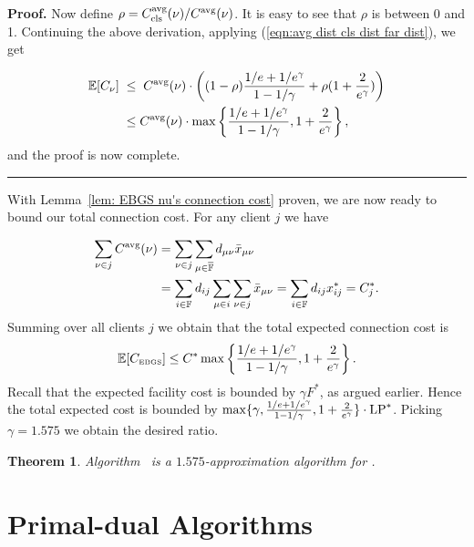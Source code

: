 \documentclass[oneside,final]{ucr}
\newtheorem{theorem}{Theorem}
\newenvironment{proof}[1][Proof]{\textbf{#1.} }{\ \rule{0.5em}{0.5em}}
\def\dsp{\def\baselinestretch{2.0}\large\normalsize}
\def\ssp{\def\baselinestretch{1.0}\large\normalsize}
\begin{document}
\begin{proof}
Now define $\rho =C_{{\mbox{\scriptsize\rm cls}}}^{{\mbox{\scriptsize\rm avg}}}(\nu)/C^{{\mbox{\scriptsize\rm avg}}}(\nu)$. It is easy
to see that $\rho$ is between 0 and 1. Continuing the above
derivation, applying (\ref{eqn:avg dist cls dist far dist}),
we get

\ssp
\begin{align*}
\mathbb{E}[C_{\nu}]
             \;&\le\; C^{{\mbox{\scriptsize\rm avg}}}(\nu) 
			\cdot\left((1-\rho)\frac{1/e+1/e^\gamma}{1-1/\gamma} 
				+ \rho (1 + \frac{2}{e^\gamma})\right)
			\\
             &\leq C^{{\mbox{\scriptsize\rm avg}}}(\nu) 
				\cdot \max\left\{\frac{1/e+1/e^\gamma}{1-1/\gamma}, 1 + \frac{2}{e^\gamma}\right\},
\end{align*}
\dsp
and the proof is now complete.
\end{proof}

With Lemma~\ref{lem: EBGS nu's connection cost} proven, we are now ready to bound our total connection cost.
For any client $j$ we have

\ssp
\begin{align*}
\sum_{\nu\in j} C^{{\mbox{\scriptsize\rm avg}}}(\nu)
	&= \sum_{\nu\in j}\sum_{\mu\in\overline{\mathbb{F}}} d_{\mu\nu}{\bar x}_{\mu\nu} 
	\\
	&= \sum_{i\in\mathbb{F}}d_{ij}\sum_{\mu\in i}\sum_{\nu\in j} {\bar x}_{\mu\nu}
	= \sum_{i\in\mathbb{F}} d_{ij}x_{ij}^\ast = C_j^\ast.
\end{align*}
\dsp
Summing over all clients $j$ we obtain that the total expected connection cost is
%
\begin{equation*}
	\mathbb{E}[ C_{\mbox{\tiny\rm EBGS}} ] \le  C^\ast\max\left\{\frac{1/e+1/e^\gamma}{1-1/\gamma}, 1+\frac{2}{e^\gamma}\right\}.
\end{equation*}
%
Recall that the expected facility cost is bounded by $\gamma F^\ast$,
as argued earlier. Hence the total expected cost is bounded by $\max\{\gamma,
\frac{1/e+1/e^\gamma}{1-1/\gamma}, 1+\frac{2}{e^\gamma}\}\cdot
\mbox{\rm LP}^\ast$. Picking $\gamma=1.575$ we obtain the desired ratio.


\begin{theorem}\label{thm:ebgs}
  Algorithm~{\EBGS} is a $1.575$-approximation algorithm for \FTFP.
\end{theorem}

\chapter{Primal-dual Algorithms} 
\label{ch: primal-dual} 
\end{document}
